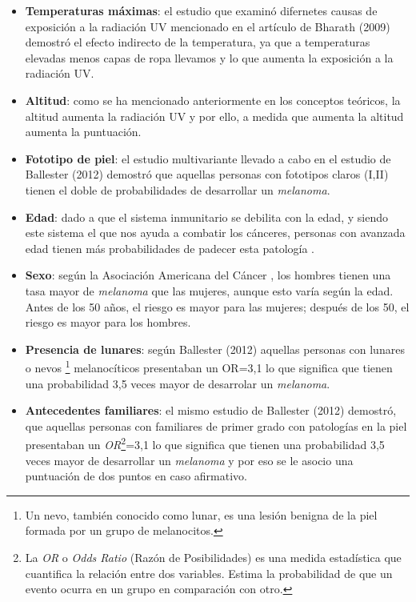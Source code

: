 \begin{itemize}
\begin{itemize}
    \item \textbf{Temperaturas máximas}: el estudio que examinó difernetes causas de exposición a la radiación UV mencionado en el artículo de Bharath (2009) \cite{bharathImpactClimateChange2009}demostró el efecto indirecto de la temperatura, ya que a temperaturas elevadas menos capas de ropa llevamos y lo que aumenta la exposición a la radiación UV.
    
    \item \textbf{Altitud}: como se ha mencionado anteriormente en los conceptos teóricos, la altitud aumenta la radiación UV y por ello, a medida que aumenta la altitud aumenta la puntuación.
    
    \item \textbf{Fototipo de piel}: el estudio multivariante llevado a cabo en el estudio de Ballester (2012) \cite{ballesterMulticenterCaseControlStudy2012} demostró que aquellas personas con fototipos claros (I,II) tienen el doble de probabilidades de desarrollar un \textit{melanoma}.

    
    \item \textbf{Edad}: dado a que el sistema inmunitario se debilita con la edad, y siendo este sistema el que nos ayuda a combatir los cánceres, personas con avanzada edad tienen más probabilidades de padecer esta patología \cite{American_Cancer_Society}. 
    
    \item \textbf{Sexo}: según la Asociación Americana del Cáncer \cite{American_Cancer_Society}, los hombres tienen una tasa mayor de \textit{melanoma} que las mujeres, aunque esto varía según la edad. Antes de los 50 años, el riesgo es mayor para las mujeres; después de los 50, el riesgo es mayor para los hombres.
    
    \item \textbf{Presencia de lunares}: según 
    Ballester (2012) \cite{ballesterMulticenterCaseControlStudy2012} aquellas personas con lunares o nevos \footnote{Un nevo, también conocido como lunar, es una lesión benigna de la piel formada por un grupo de melanocitos.} melanocíticos presentaban un OR=3,1 lo que significa que tienen una probabilidad 3,5 veces mayor de desarrolar un \textit{melanoma}.
    
    \item \textbf{Antecedentes familiares}: el mismo estudio de Ballester (2012) \cite{ballesterMulticenterCaseControlStudy2012} demostró, que aquellas personas con familiares de primer grado con patologías en la piel presentaban un \textit{OR}\footnote{La \textit{OR} o \textit{Odds Ratio} (Razón de Posibilidades) es una medida estadística que cuantifica la relación entre dos variables. Estima la probabilidad de que un evento ocurra en un grupo en comparación con otro.}=3,1 lo que significa que tienen una probabilidad 3,5 veces mayor de desarrollar un \textit{melanoma} y por eso se le asocio una puntuación de dos puntos en caso afirmativo.


\end{itemize}
\end{itemize}
